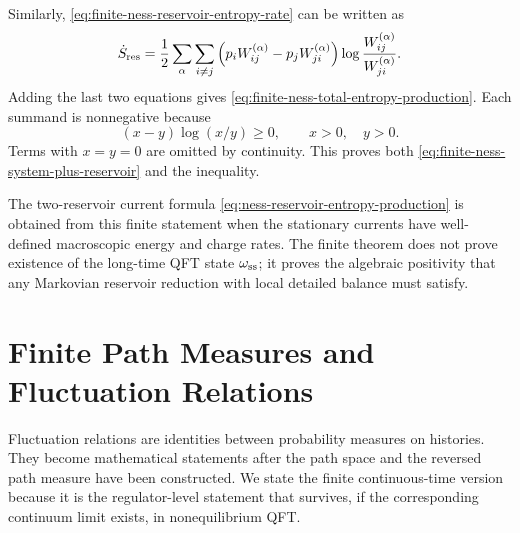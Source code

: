 Similarly, \eqref{eq:finite-ness-reservoir-entropy-rate} can be written as
\begin{equation}
  \dot S_{\rm res}
  =
  \frac12\sum_{\alpha}\sum_{i\ne j}
  \left(
    p_iW^{(\alpha)}_{ij}
    -
    p_jW^{(\alpha)}_{ji}
  \right)
  \log\frac{W^{(\alpha)}_{ij}}{W^{(\alpha)}_{ji}} .
  \label{eq:finite-ness-reservoir-current-form}
\end{equation}
Adding the last two equations gives
\eqref{eq:finite-ness-total-entropy-production}.  Each summand is
nonnegative because
\begin{equation}
  (x-y)\log(x/y)\ge0,\qquad x>0,\quad y>0 .
  \label{eq:finite-ness-log-monotonicity}
\end{equation}
Terms with \(x=y=0\) are omitted by continuity.  This proves both
\eqref{eq:finite-ness-system-plus-reservoir} and the inequality.

The two-reservoir current formula
\eqref{eq:ness-reservoir-entropy-production} is obtained from this finite
statement when the stationary currents have well-defined macroscopic energy
and charge rates.  The finite theorem does not prove existence of the
long-time QFT state \(\omega_{\rm ss}\); it proves the algebraic positivity
that any Markovian reservoir reduction with local detailed balance must
satisfy.

\section{Finite Path Measures and Fluctuation Relations}
\label{sec:finite-path-measure-fluctuation-relations}

Fluctuation relations are identities between probability measures on
histories.  They become mathematical statements after the path space and the
reversed path measure have been constructed.  We state the finite
continuous-time version because it is the regulator-level statement that
survives, if the corresponding continuum limit exists, in nonequilibrium QFT.

